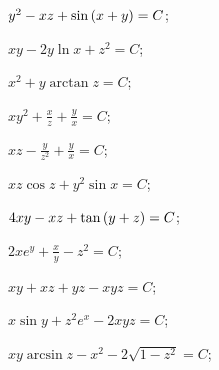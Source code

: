 	\begin{enumsols}

		\item \( y^2 - xz + \sin\left( x + y \right) = C \); \sfill %
		\item \( xy - 2y \ln{x} + z^2 = C \); \sfill %
		\item \( x^2 + y \arctan{z} = C \); \sfill %
		\item \( xy^2 + \frac{x}{z} + \frac{y}{x} = C \); \sfill %
		\item \( xz - \frac{y}{z^2} + \frac{y}{x} = C \); \sfill %
		\item \( xz \cos{z} + y^2 \sin{x} = C \); \sfill %
		\item \( 4xy - xz + \tan\left( y + z \right) = C \); \sfill %
		\item \( 2x e^y + \frac{x}{y} - z^2 = C \); \sfill %
		\item \( xy + xz + yz - xyz = C \); \sfill %
		\item \( x \sin{y} + z^2 e^x - 2xyz = C \); \sfill %
		\item \( xy \arcsin{z} - x^2 - 2 \sqrt{1 - z^2} = C \); \sfill %


\end{enumsols}
